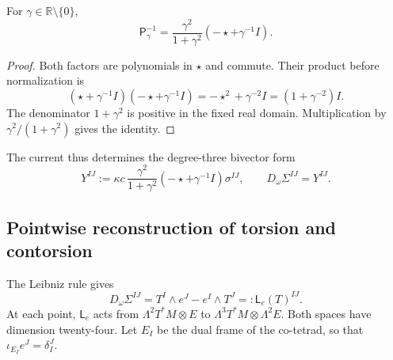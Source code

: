 \begin{lemma}
\label{vii:lem:inversa-holst}
For \(\gamma\in\mathbb R\setminus\{0\}\),
\begin{equation}
 \mathsf P_\gamma^{-1}
 =\frac{\gamma^2}{1+\gamma^2}
                      (-\star+\gamma^{-1}I).
 \label{vii:eq:inversa-holst}
\end{equation}
\end{lemma}
\begin{proof}
Both factors are polynomials in \(\star\) and commute. Their product
before normalization is
\[
 (\star+\gamma^{-1}I)(-\star+\gamma^{-1}I)
 =-\star^2+\gamma^{-2}I=(1+\gamma^{-2})I.
\]
The denominator \(1+\gamma^2\) is positive in the fixed real domain.
Multiplication by \(\gamma^2/(1+\gamma^2)\) gives the identity.
\end{proof}

The current thus determines the degree-three bivector form
\begin{equation}
 Y^{IJ}:=\kappa c\,
   \frac{\gamma^2}{1+\gamma^2}
   (-\star+\gamma^{-1}I)\sigma^{IJ},
 \qquad D_\omega\Sigma^{IJ}=Y^{IJ}.
 \label{vii:eq:corriente-dualizada}
\end{equation}

\subsection{Pointwise reconstruction of torsion and contorsion}
\label{vii:subsec:reconstruccion-torsion}

The Leibniz rule gives
\begin{equation}
 D_\omega\Sigma^{IJ}
 =T^I\wedge e^J-e^I\wedge T^J
 =:\mathsf L_e(T)^{IJ}.
 \label{vii:eq:mapa-torsion}
\end{equation}
At each point, \(\mathsf L_e\) acts from
\(\Lambda^2T^*M\otimes E\) to
\(\Lambda^3T^*M\otimes\Lambda^2E\). Both spaces have dimension
twenty-four. Let \(E_I\) be the dual frame of the co-tetrad, so that
\(\iota_{E_I}e^J=\delta_I^J\).

